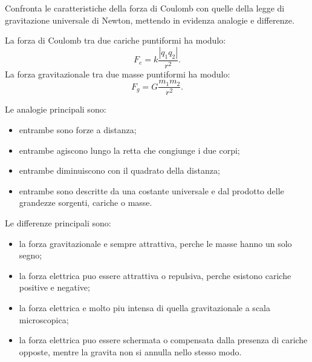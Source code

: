 
\begin{esercizio}
Confronta le caratteristiche della forza di Coulomb con quelle della legge di
gravitazione universale di Newton, mettendo in evidenza analogie e differenze.
\end{esercizio}

\begin{soluzione}
La forza di Coulomb tra due cariche puntiformi ha modulo:
\[
F_e=k\frac{|q_1q_2|}{r^2}.
\]
La forza gravitazionale tra due masse puntiformi ha modulo:
\[
F_g=G\frac{m_1m_2}{r^2}.
\]

Le analogie principali sono:
\begin{itemize}
  \item entrambe sono forze a distanza;
  \item entrambe agiscono lungo la retta che congiunge i due corpi;
  \item entrambe diminuiscono con il quadrato della distanza;
  \item entrambe sono descritte da una costante universale e dal prodotto delle
  grandezze sorgenti, cariche o masse.
\end{itemize}

Le differenze principali sono:
\begin{itemize}
  \item la forza gravitazionale e sempre attrattiva, perche le masse hanno un
  solo segno;
  \item la forza elettrica puo essere attrattiva o repulsiva, perche esistono
  cariche positive e negative;
  \item la forza elettrica e molto piu intensa di quella gravitazionale a scala
  microscopica;
  \item la forza elettrica puo essere schermata o compensata dalla presenza di
  cariche opposte, mentre la gravita non si annulla nello stesso modo.
\end{itemize}
\end{soluzione}
